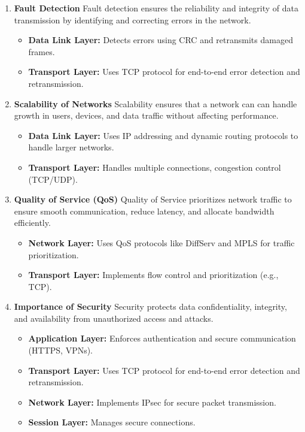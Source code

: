 \begin{enumerate}[itemsep=2ex]
   \item \textbf{Fault Detection}
   Fault detection ensures the reliability and integrity of data transmission by identifying and correcting errors in the network.

   \begin{itemize}
      \item \textbf{Data Link Layer:} Detects errors using CRC and retransmits damaged frames.
      \item \textbf{Transport Layer:} Uses TCP protocol for end-to-end error detection and retransmission.
   \end{itemize}
   
   \item \textbf{Scalability of Networks}
   Scalability ensures that a network can can handle growth in users, devices, and data traffic without affecting performance.
   \begin{itemize}
      \item \textbf{Data Link Layer:} Uses IP addressing and dynamic routing protocols to handle larger networks.
      \item \textbf{Transport Layer:} Handles multiple connections, congestion control (TCP/UDP).
   \end{itemize}
   
   \item \textbf{Quality of Service (QoS)}
   Quality of Service prioritizes network traffic to ensure smooth communication, reduce latency, and allocate bandwidth efficiently.
   \begin{itemize}
      \item \textbf{Network Layer:} Uses QoS protocols like DiffServ and MPLS for traffic prioritization.
      \item \textbf{Transport Layer:} Implements flow control and prioritization (e.g., TCP).
   \end{itemize}
   
   \item \textbf{Importance of Security}
   Security protects data confidentiality, integrity, and availability from unauthorized access and attacks.
   \begin{itemize}
      \item \textbf{Application Layer:} Enforces authentication and secure communication (HTTPS, VPNs).
      \item \textbf{Transport Layer:} Uses TCP protocol for end-to-end error detection and retransmission.
      \item \textbf{Network Layer:} Implements IPsec for secure packet transmission.
      \item \textbf{Session Layer:} Manages secure connections.
   \end{itemize}
\end{enumerate}


